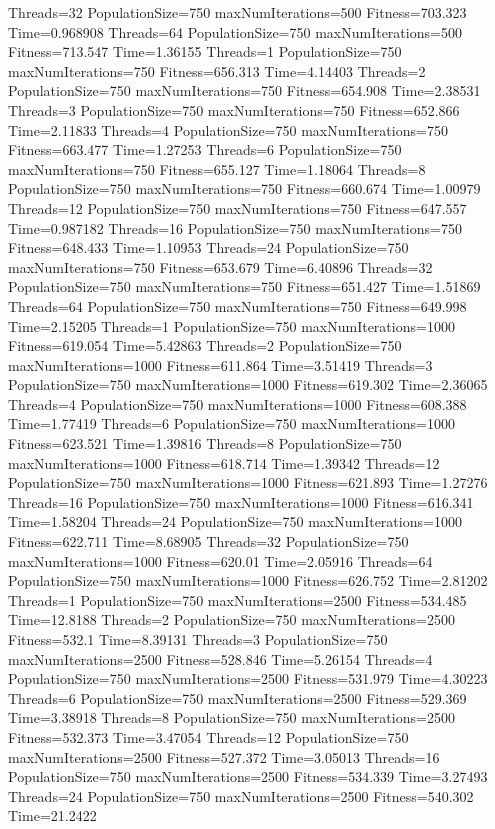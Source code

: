 \documentclass[10pt,letterpaper]{article}
\begin{document}
Threads=32 PopulationSize=750 maxNumIterations=500 Fitness=703.323 Time=0.968908
Threads=64 PopulationSize=750 maxNumIterations=500 Fitness=713.547 Time=1.36155
Threads=1 PopulationSize=750 maxNumIterations=750 Fitness=656.313 Time=4.14403
Threads=2 PopulationSize=750 maxNumIterations=750 Fitness=654.908 Time=2.38531
Threads=3 PopulationSize=750 maxNumIterations=750 Fitness=652.866 Time=2.11833
Threads=4 PopulationSize=750 maxNumIterations=750 Fitness=663.477 Time=1.27253
Threads=6 PopulationSize=750 maxNumIterations=750 Fitness=655.127 Time=1.18064
Threads=8 PopulationSize=750 maxNumIterations=750 Fitness=660.674 Time=1.00979
Threads=12 PopulationSize=750 maxNumIterations=750 Fitness=647.557 Time=0.987182
Threads=16 PopulationSize=750 maxNumIterations=750 Fitness=648.433 Time=1.10953
Threads=24 PopulationSize=750 maxNumIterations=750 Fitness=653.679 Time=6.40896
Threads=32 PopulationSize=750 maxNumIterations=750 Fitness=651.427 Time=1.51869
Threads=64 PopulationSize=750 maxNumIterations=750 Fitness=649.998 Time=2.15205
Threads=1 PopulationSize=750 maxNumIterations=1000 Fitness=619.054 Time=5.42863
Threads=2 PopulationSize=750 maxNumIterations=1000 Fitness=611.864 Time=3.51419
Threads=3 PopulationSize=750 maxNumIterations=1000 Fitness=619.302 Time=2.36065
Threads=4 PopulationSize=750 maxNumIterations=1000 Fitness=608.388 Time=1.77419
Threads=6 PopulationSize=750 maxNumIterations=1000 Fitness=623.521 Time=1.39816
Threads=8 PopulationSize=750 maxNumIterations=1000 Fitness=618.714 Time=1.39342
Threads=12 PopulationSize=750 maxNumIterations=1000 Fitness=621.893 Time=1.27276
Threads=16 PopulationSize=750 maxNumIterations=1000 Fitness=616.341 Time=1.58204
Threads=24 PopulationSize=750 maxNumIterations=1000 Fitness=622.711 Time=8.68905
Threads=32 PopulationSize=750 maxNumIterations=1000 Fitness=620.01 Time=2.05916
Threads=64 PopulationSize=750 maxNumIterations=1000 Fitness=626.752 Time=2.81202
Threads=1 PopulationSize=750 maxNumIterations=2500 Fitness=534.485 Time=12.8188
Threads=2 PopulationSize=750 maxNumIterations=2500 Fitness=532.1 Time=8.39131
Threads=3 PopulationSize=750 maxNumIterations=2500 Fitness=528.846 Time=5.26154
Threads=4 PopulationSize=750 maxNumIterations=2500 Fitness=531.979 Time=4.30223
Threads=6 PopulationSize=750 maxNumIterations=2500 Fitness=529.369 Time=3.38918
Threads=8 PopulationSize=750 maxNumIterations=2500 Fitness=532.373 Time=3.47054
Threads=12 PopulationSize=750 maxNumIterations=2500 Fitness=527.372 Time=3.05013
Threads=16 PopulationSize=750 maxNumIterations=2500 Fitness=534.339 Time=3.27493
Threads=24 PopulationSize=750 maxNumIterations=2500 Fitness=540.302 Time=21.2422
\end{document}
